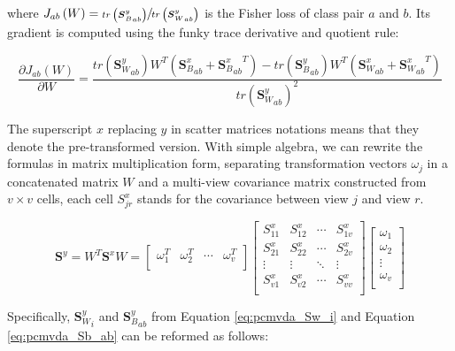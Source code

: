         where $J_{ab}\left(W\right)=\sfrac{tr\left({\boldsymbol{S}_B^y}_{ab}\right)}{tr\left({\boldsymbol{S}_W^y}_{ab}\right)}$ is the Fisher loss of class pair $a$ and $b$. Its gradient is computed using the funky trace derivative and quotient rule:

        \begin{equation}
            \frac{\partial J_{ab}\left(W\right)}{\partial W}=\frac{tr\left({\boldsymbol{S}_W^y}_{ab}\right)W^T\left({\boldsymbol{S}_B^x}_{ab}+{{\boldsymbol{S}_B^x}_{ab}}^T\right)-tr\left({\boldsymbol{S}_B^y}_{ab}\right)W^T\left({\boldsymbol{S}_W^x}_{ab}+{{\boldsymbol{S}_W^x}_{ab}}^T\right)}{{tr\left({\boldsymbol{S}_W^y}_{ab}\right)}^2}
            \label{eq:grad_Jab}
        \end{equation}

        The superscript $x$ replacing $y$ in scatter matrices notations means that they denote the pre-transformed version. With simple algebra, we can rewrite the formulas in matrix multiplication form, separating transformation vectors $\omega_j$ in a concatenated matrix $W$ and a multi-view covariance matrix constructed from $v\times v$ cells, each cell $S^x_{jr}$ stands for the covariance between view $j$ and view $r$.

        \begin{equation}
            \boldsymbol{S}^y=W^T\boldsymbol{S}^xW=\left[\begin{matrix}\omega_1^T&\omega_2^T&\cdots&\omega_v^T\\\end{matrix}\right]\left[\begin{matrix}S^x_{11}&S^x_{12}&\cdots&S^x_{1v}\\S^x_{21}&S^x_{22}&\cdots&S^x_{2v}\\\vdots&\vdots&\ddots&\vdots\\S^x_{v1}&S^x_{v2}&\cdots&S^x_{vv}\\\end{matrix}\right]\left[\begin{matrix}\omega_1\\\omega_2\\\vdots\\\omega_v\\\end{matrix}\right]
        \end{equation}

        Specifically, ${\boldsymbol{S}^y_W}_{i}$ and ${\boldsymbol{S}^y_B}_{ab}$ from Equation \eqref{eq:pcmvda_Sw_i} and Equation \eqref{eq:pcmvda_Sb_ab} can be reformed as follows:

